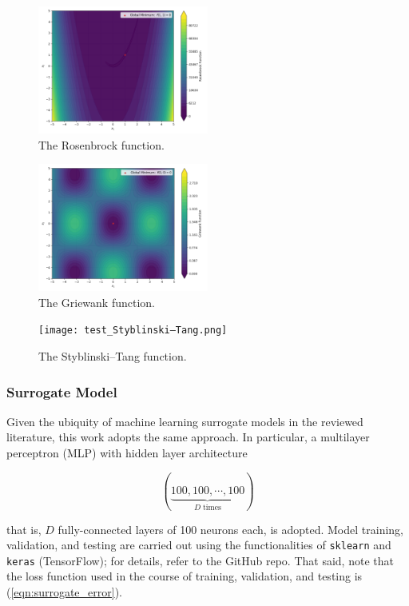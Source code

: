 \documentclass[conference]{IEEEtran}
\begin{document}
\begin{figure}[htbp]
	\centerline{\includegraphics[width=0.5\textwidth]{test_Rosenbrock.png}}
	\caption{The Rosenbrock function.}
	\label{fig:Rosenbrock}
\end{figure}

\begin{figure}[htbp]
	\centerline{\includegraphics[width=0.5\textwidth]{test_Griewank.png}}
	\caption{The Griewank function.}
	\label{fig:Griewank}
\end{figure}

\begin{figure}[htbp]
	\centerline{\texttt{[image: test\_Styblinski–Tang.png]}}
	\caption{The Styblinski–Tang function.}
	\label{fig:Styblinski–Tang}
\end{figure}

\subsubsection{Surrogate Model}

Given the ubiquity of machine learning surrogate models in the reviewed literature, this work adopts the same approach. In particular, a multilayer perceptron (MLP) with hidden layer architecture

$$ \left(\underbrace{100, 100, \cdots, 100}_{D\;\textrm{times}}\right) $$

\noindent that is, $D$ fully-connected layers of 100 neurons each, is adopted. Model training, validation, and testing are carried out using the functionalities of \texttt{sklearn} and \texttt{keras} (TensorFlow); for details, refer to the GitHub repo. That said, note that the loss function used in the course of training, validation, and testing is (\ref{eqn:surrogate_error}).
\end{document}
